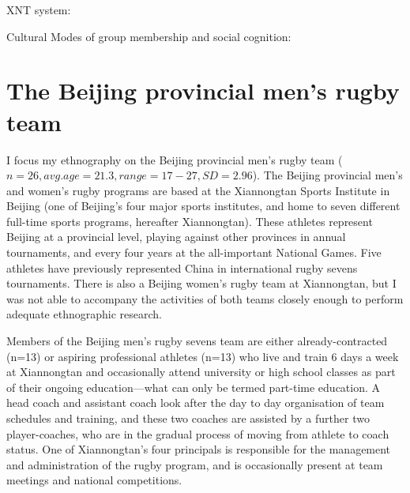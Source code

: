 



XNT system:



Cultural Modes of group membership and social cognition:





\section{The Beijing provincial men's rugby team}
I focus my ethnography on the Beijing provincial men's rugby team ($n=26, avg. age=21.3, range = 17-27, SD = 2.96$).  The Beijing provincial men's and women's rugby programs are based at the Xiannongtan Sports Institute in Beijing (one of Beijing's four major sports institutes, and home to seven different full-time sports programs, hereafter Xiannongtan).  These athletes represent Beijing at a provincial level, playing against other provinces in annual tournaments, and every four years at the all-important National Games.  Five athletes have previously represented China in international rugby sevens tournaments.  There is also a Beijing women's rugby team at Xiannongtan, but I was not able to accompany the activities of both teams closely enough to perform adequate ethnographic research.

Members of the Beijing men's rugby sevens team are either already-contracted (n=13) or aspiring professional athletes (n=13) who live and train 6 days a week at Xiannongtan and occasionally attend university or high school classes as part of their ongoing education---what can only be termed part-time education.  A head coach and assistant coach look after the day to day organisation of team schedules and training, and these two coaches are assisted by a further two player-coaches, who are in the gradual process of moving from athlete to coach status.  One of Xiannongtan's four principals is responsible for the management and administration of the rugby program, and is occasionally present at team meetings and national competitions.

